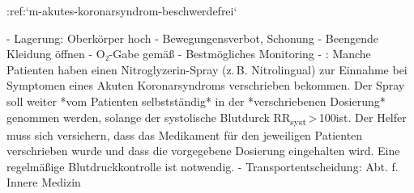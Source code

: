 
:ref:`m-akutes-koronarsyndrom-beschwerdefrei`
%
\begin{itemize}
    -   Lagerung: Oberkörper hoch
  -   Bewegungensverbot, Schonung
  -   Beengende Kleidung öffnen
    -   O₂-Gabe gemäß 
  -   Bestmögliches Monitoring
  -   : Manche Patienten haben einen
  Nitroglyzerin-Spray (z.\,B. Nitrolingual{\texttrademark})
  zur Einnahme bei Symptomen eines Akuten Koronarsyndroms
  verschrieben bekommen. Der Spray soll weiter *vom
  Patienten selbstständig* in der *verschriebenen
  Dosierung* genommen werden, solange der systolische
  Blutdurck RR\textsubscript{syst}\,{\textgreater}\,100\MmHg*
  ist. Der Helfer muss sich versichern, dass das Medikament
  für den jeweiligen Patienten verschrieben wurde und dass
  die vorgegebene Dosierung eingehalten wird. Eine
  regelmäßige Blutdruckkontrolle ist notwendig.
  -   Transportentscheidung: Abt. f. Innere Medizin
\end{itemize}